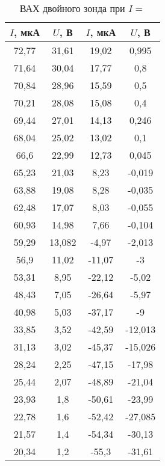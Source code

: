 \begin{table}[h!]
    \centering
    \begin{tabular}{|c|c|c|c|}
    \hline
    $I$, мкА & $U$, В & $I$, мкА & $U$, В    \\ \hline
    72,77    & 31,61  & 19,02    & 0,995     \\ \hline
    71,64    & 30,04  & 17,77    & 0,8       \\ \hline
    70,84    & 28,96  & 15,59    & 0,5       \\ \hline
    70,21    & 28,08  & 15,08    & 0,4       \\ \hline
    69,44    & 27,01  & 14,13    & 0,246     \\ \hline
    68,04    & 25,02  & 13,02    & 0,1       \\ \hline
    66,6     & 22,99  & 12,73    & 0,045     \\ \hline
    65,23    & 21,03  & 8,23     & -0,019    \\ \hline
    63,88    & 19,08  & 8,28     & -0,035    \\ \hline
    62,48    & 17,07  & 8,03     & -0,055    \\ \hline
    60,93    & 14,98  & 7,66     & -0,104    \\ \hline
    59,29    & 13,082 & -4,97    & -2,013    \\ \hline
    56,9     & 11,02  & -11,07   & -3        \\ \hline
    53,31    & 8,95   & -22,12   & -5,02     \\ \hline
    48,43    & 7,05   & -26,64   & -5,97     \\ \hline
    40,98    & 5,03   & -37,17   & -9        \\ \hline
    33,85    & 3,52   & -42,59   & -12,013   \\ \hline
    31,13    & 3,02   & -45,37   & -15,026   \\ \hline
    28,24    & 2,25   & -47,15   & -17,98    \\ \hline
    25,44    & 2,07   & -48,89   & -21,04    \\ \hline
    23,93    & 1,8    & -50,61   & -23,99    \\ \hline
    22,78    & 1,6    & -52,42   & -27,085   \\ \hline
    21,57    & 1,4    & -54,34   & -30,13    \\ \hline
    20,34    & 1,2    & -55,3    & -31,61    \\ \hline
    \end{tabular}
    \caption{ВАХ двойного зонда при $I = $}
    \label{VAC3}
\end{table}